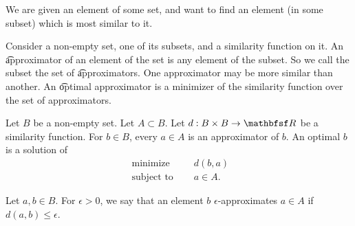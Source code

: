 

We are given an element of some set, and want to find an element (in some subset) which is most similar to it.


Consider a non-empty set, one of its subsets, and a similarity function on it.
An \t{approximator} of an element of the set is any element of the subset.
So we call the subset the set of \t{approximators}.
One approximator may be more similar than another.
An \t{optimal} approximator is a minimizer of the similarity function over the set of approximators.


Let $B$ be a non-empty set.
Let $A \subset B$.
Let $d: B \times B \to \R$ be a similarity function.
For $b \in B$, every $a \in A$ is an approximator of $b$.
An optimal $b$ is a solution of
\[
\begin{aligned}
  \text{ minimize }   & \quad d(b, a) \\
  \text{ subject to } & \quad a \in A.
\end{aligned}
\]


Let $a, b \in B$.
For $\epsilon > 0$, we say that an element $b$ \t{$\epsilon$-approximates} $a \in A$ if $d(a, b) \leq \epsilon$.

\blankpage
